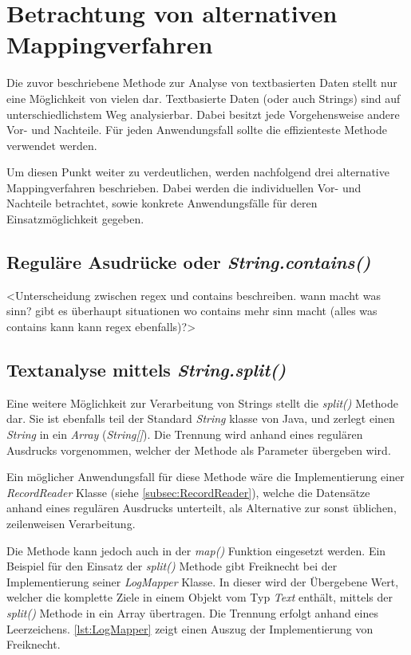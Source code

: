 \section{Betrachtung von alternativen Mappingverfahren}
Die zuvor beschriebene Methode zur Analyse von textbasierten Daten stellt nur eine Möglichkeit von vielen dar. Textbasierte Daten (oder auch Strings) sind auf unterschiedlichstem Weg analysierbar. Dabei besitzt jede Vorgehensweise andere Vor- und Nachteile. Für jeden Anwendungsfall sollte die effizienteste Methode verwendet werden.

Um diesen Punkt weiter zu verdeutlichen, werden nachfolgend drei alternative Mappingverfahren beschrieben. Dabei werden die individuellen Vor- und Nachteile betrachtet, sowie konkrete Anwendungsfälle für deren Einsatzmöglichkeit gegeben. 

\subsection{Reguläre Asudrücke oder \textit{String.contains()}}\label{subsec:Contains}


<Unterscheidung zwischen regex und contains beschreiben. wann macht was sinn? gibt es überhaupt situationen wo contains mehr sinn macht (alles was contains kann kann regex ebenfalls)?>


\subsection{Textanalyse mittels \textit{String.split()}}
Eine weitere Möglichkeit zur Verarbeitung von Strings stellt die \textit{split()} Methode dar. Sie ist ebenfalls teil der Standard \textit{String} klasse von Java, und zerlegt einen \textit{String} in ein \textit{Array} (\textit{String[]}). Die Trennung wird anhand eines regulären Ausdrucks vorgenommen, welcher der Methode als Parameter übergeben wird.

Ein möglicher Anwendungsfall für diese Methode wäre die Implementierung einer \textit{RecordReader} Klasse (siehe \autoref{subsec:RecordReader}), welche die Datensätze anhand eines regulären Ausdrucks unterteilt, als Alternative zur sonst üblichen, zeilenweisen Verarbeitung.

Die Methode kann jedoch auch in der \textit{map()} Funktion eingesetzt werden. Ein Beispiel für den Einsatz der \textit{split()} Methode gibt Freiknecht bei der Implementierung seiner \textit{LogMapper} Klasse. In dieser wird der Übergebene Wert, welcher die komplette Ziele in einem Objekt vom Typ \textit{Text} enthält, mittels der \textit{split()} Methode in ein Array übertragen. Die Trennung erfolgt anhand eines Leerzeichens. \autoref{lst:LogMapper} zeigt einen Auszug der Implementierung von Freiknecht. \\

